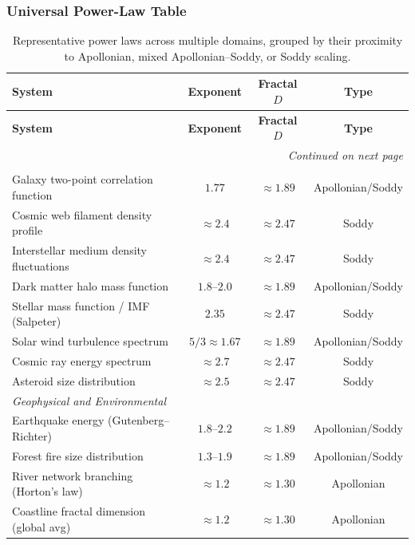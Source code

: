 \documentclass[11pt,a4paper]{article}
\begin{document}
\subsubsection{Universal Power-Law Table}
\begin{longtable}{p{6.8cm}ccc}
\caption{Representative power laws across multiple domains, grouped by their proximity to Apollonian, mixed Apollonian--Soddy, or Soddy scaling.} \\
\toprule
\textbf{System} & \textbf{Exponent} & \textbf{Fractal $D$} & \textbf{Type} \\
\midrule
\endfirsthead
\toprule
\textbf{System} & \textbf{Exponent} & \textbf{Fractal $D$} & \textbf{Type} \\
\midrule
\endhead
\midrule\multicolumn{4}{r}{\textit{Continued on next page}}\\
\endfoot
\bottomrule
\endlastfoot

\multicolumn{4}{l}{\textit{Astrophysical and Cosmological}} \\
\midrule
Galaxy two-point correlation function & $1.77$ & $\approx1.89$ & Apollonian/Soddy \\
Cosmic web filament density profile & $\approx2.4$ & $\approx2.47$ & Soddy \\
Interstellar medium density fluctuations & $\approx2.4$ & $\approx2.47$ & Soddy \\
Dark matter halo mass function & $1.8$--$2.0$ & $\approx1.89$ & Apollonian/Soddy \\
Stellar mass function / IMF (Salpeter) & $2.35$ & $\approx2.47$ & Soddy \\
Solar wind turbulence spectrum & $5/3\approx1.67$ & $\approx1.89$ & Apollonian/Soddy \\
Cosmic ray energy spectrum & $\approx2.7$ & $\approx2.47$ & Soddy \\
Asteroid size distribution & $\approx2.5$ & $\approx2.47$ & Soddy \\

\midrule
\multicolumn{4}{l}{\textit{Geophysical and Environmental}} \\
\midrule
Earthquake energy (Gutenberg--Richter) & $1.8$--$2.2$ & $\approx1.89$ & Apollonian/Soddy \\
Forest fire size distribution & $1.3$--$1.9$ & $\approx1.89$ & Apollonian/Soddy \\
River network branching (Horton's law) & $\approx1.2$ & $\approx1.30$ & Apollonian \\
Coastline fractal dimension (global avg) & $\approx1.2$ & $\approx1.30$ & Apollonian \\


\end{longtable}
\end{document}
